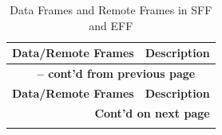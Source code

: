 \begin{longtable}[c]{|p{3.5cm}|p{12cm}|} 
    
  \caption{Data Frames and Remote Frames in SFF and EFF}
  \label{tab:twai-data-frames-and-remote-frames} 
  \\\hline
  \rowcolor{lightgray}
    \textbf{Data/Remote Frames} & \textbf{Description}
  \\\hline
  \endfirsthead
  
  \multicolumn{2}{c}{\bfseries \tablename\ \thetable{} -- cont'd from previous page}\\  \hline
  
  \rowcolor{lightgray}
    \textbf{Data/Remote Frames} & \textbf{Description}
  \\\hline
  \endhead
  
  \multicolumn{2}{r}{\textbf{Cont'd on next page}} \\
  \endfoot
  \endlastfoot
  

\end{longtable}
